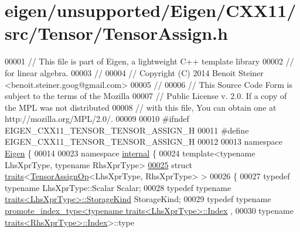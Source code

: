 \hypertarget{eigen_2unsupported_2_eigen_2_c_x_x11_2src_2_tensor_2_tensor_assign_8h_source}{}\section{eigen/unsupported/\+Eigen/\+C\+X\+X11/src/\+Tensor/\+Tensor\+Assign.h}
\label{eigen_2unsupported_2_eigen_2_c_x_x11_2src_2_tensor_2_tensor_assign_8h_source}

\begin{DoxyCode}
00001 \textcolor{comment}{// This file is part of Eigen, a lightweight C++ template library}
00002 \textcolor{comment}{// for linear algebra.}
00003 \textcolor{comment}{//}
00004 \textcolor{comment}{// Copyright (C) 2014 Benoit Steiner <benoit.steiner.goog@gmail.com>}
00005 \textcolor{comment}{//}
00006 \textcolor{comment}{// This Source Code Form is subject to the terms of the Mozilla}
00007 \textcolor{comment}{// Public License v. 2.0. If a copy of the MPL was not distributed}
00008 \textcolor{comment}{// with this file, You can obtain one at http://mozilla.org/MPL/2.0/.}
00009 
00010 \textcolor{preprocessor}{#ifndef EIGEN\_CXX11\_TENSOR\_TENSOR\_ASSIGN\_H}
00011 \textcolor{preprocessor}{#define EIGEN\_CXX11\_TENSOR\_TENSOR\_ASSIGN\_H}
00012 
00013 \textcolor{keyword}{namespace }\hyperlink{namespace_eigen}{Eigen} \{
00014 
00023 \textcolor{keyword}{namespace }\hyperlink{namespaceinternal}{internal} \{
00024 \textcolor{keyword}{template}<\textcolor{keyword}{typename} LhsXprType, \textcolor{keyword}{typename} RhsXprType>
\hyperlink{struct_eigen_1_1internal_1_1traits_3_01_tensor_assign_op_3_01_lhs_xpr_type_00_01_rhs_xpr_type_01_4_01_4}{00025} \textcolor{keyword}{struct }\hyperlink{struct_eigen_1_1internal_1_1traits}{traits}<\hyperlink{class_eigen_1_1_tensor_assign_op}{TensorAssignOp}<LhsXprType, RhsXprType> >
00026 \{
00027   \textcolor{keyword}{typedef} \textcolor{keyword}{typename} LhsXprType::Scalar Scalar;
00028   \textcolor{keyword}{typedef} \textcolor{keyword}{typename} \hyperlink{struct_eigen_1_1internal_1_1traits}{traits<LhsXprType>::StorageKind} StorageKind;
00029   \textcolor{keyword}{typedef} \textcolor{keyword}{typename} \hyperlink{struct_eigen_1_1internal_1_1promote__index__type}{promote\_index\_type<typename traits<LhsXprType>::Index}
      ,
00030                                       \textcolor{keyword}{typename} \hyperlink{struct_eigen_1_1internal_1_1traits}{traits<RhsXprType>::Index}>::type 

\end{DoxyCode}
